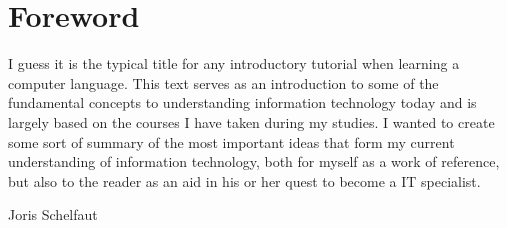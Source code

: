 \chapter*{Foreword}\label{chapter:foreword}


I guess it is the typical title for any introductory tutorial when learning a computer language. This text serves as an introduction to some of the fundamental concepts to understanding information technology today and is largely based on the courses I have taken during my studies. I wanted to create some sort of summary of the most important ideas that form my current understanding of information technology, both for myself as a work of reference, but also to the reader as an aid in his or her quest to become a IT specialist.

\begin{flushright}
Joris Schelfaut
\end{flushright}